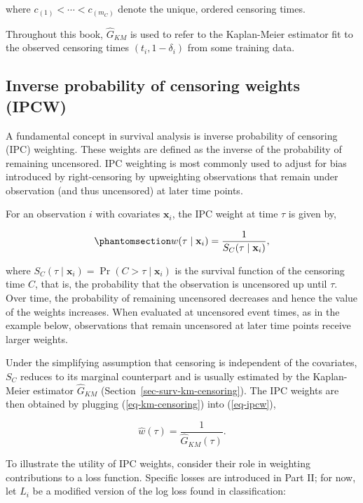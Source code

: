 \documentclass[
  letterpaper,
  krantz2]{style/krantz}
\begin{document}
where \(c_{(1)} < \cdots < c_{(m_C)}\) denote the unique, ordered
censoring times.

Throughout this book, \(\hat{G}_{KM}\) is used to refer to the
Kaplan-Meier estimator fit to the observed censoring times
\((t_i, 1-\delta_i)\) from some training data.

\subsection{Inverse probability of censoring weights
(IPCW)}\label{sec-surv-ipcw}

A fundamental concept in survival analysis is inverse probability of
censoring (IPC)
weighting. These weights
are defined as the inverse of the probability of remaining uncensored.
IPC weighting is most commonly used to adjust for bias introduced by
right-censoring by upweighting observations that
remain under observation (and thus uncensored) at later time points.

For an observation \(i\) with covariates \(\mathbf{x}_i\), the IPC
weight at time \(\tau\) is given by,

\begin{equation}\phantomsection\label{eq-ipcw}{
w(\tau \mid \mathbf{x}_i) = \frac{1}{S_C(\tau \mid \mathbf{x}_i)},
}\end{equation}

where \(S_C(\tau \mid \mathbf{x}_i) = \Pr(C > \tau \mid \mathbf{x}_i)\)
is the survival function of the censoring time \(C\), that is, the
probability that the observation is uncensored up until \(\tau\). Over
time, the probability of remaining uncensored decreases and hence the
value of the weights increases. When evaluated at uncensored event
times, as in the example below, observations that remain uncensored at
later time points receive larger weights.

Under the simplifying assumption that censoring is independent of the
covariates, \(S_C\) reduces to its marginal counterpart and is usually
estimated by the Kaplan-Meier estimator \(\hat{G}_{KM}\)
(Section~\ref{sec-surv-km-censoring}). The IPC weights are then obtained
by plugging (\ref{eq-km-censoring}) into (\ref{eq-ipcw}),

\[
\hat{w}(\tau) = \frac{1}{\hat{G}_{KM}(\tau)}.
\]

To illustrate the utility of IPC weights, consider their role in
weighting contributions to a loss function. Specific losses are
introduced in Part II; for now, let \(L_i\) be a modified version of the
log loss found in classification:
\end{document}
